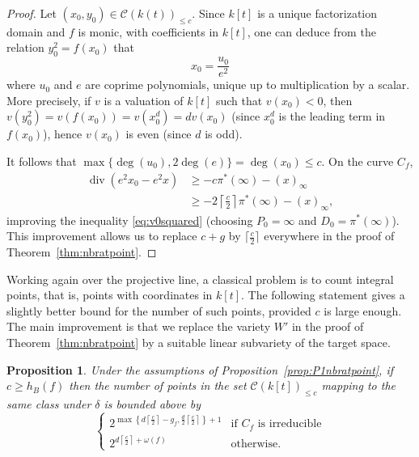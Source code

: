 \documentclass[11pt]{article}
\theoremstyle{plain}
\newtheorem{proposition}[theorem]{Proposition}
\theoremstyle{definition}
\DeclareMathOperator{\divisor}{div}
\begin{document}
\begin{proof}
Let $(x_0,y_0)\in \mathcal{C}(k(t))_{\leq c}$. Since $k[t]$ is a unique factorization domain and $f$ is monic, with coefficients in $k[t]$, one can deduce from the relation $y_0^2=f(x_0)$ that
$$
x_0=\frac{u_0}{e^2}
$$
where $u_0$ and $e$ are coprime polynomials, unique up to multiplication by a scalar. More precisely, if $v$ is a valuation of $k[t]$ such that $v(x_0)<0$, then $v(y_0^2)=v(f(x_0))=v(x_0^d)=dv(x_0)$ (since $x_0^d$ is the leading term in $f(x_0)$), hence $v(x_0)$ is even (since $d$ is odd).

It follows that $\max\{\deg(u_0),2\deg(e)\} = \deg(x_0) \leq c$. On the curve $C_f$,
\begin{align*}
\divisor(e^2x_0-e^2x) &\geq -c\pi^*(\infty) -(x)_\infty \\
                      &\geq -2\left\lceil\frac{c}{2}\right\rceil\pi^*(\infty) -(x)_\infty,
\end{align*}
improving the inequality \eqref{eq:v0squared} (choosing $P_0=\infty$ and $D_0=\pi^*(\infty)$). This improvement allows us to replace $c+g$ by $\lceil\frac{c}{2}\rceil$ everywhere in the proof of Theorem~\ref{thm:nbratpoint}.
\end{proof}

Working again over the projective line, a classical problem is to count integral points, that is, points with coordinates in $k[t]$. The following statement gives a slightly better bound for the number of such points, provided $c$ is large enough. The main improvement is that we replace the variety $W'$ in the proof of Theorem~\ref{thm:nbratpoint} by a suitable linear subvariety of the target space.

\begin{proposition}
\label{prop:P1nbintpoint}
Under the assumptions of Proposition~\ref{prop:P1nbratpoint}, if $c\geq h_B(f)$ then the number of points in the set $\mathcal{C}(k[t])_{\leq c}$ mapping to the same class under $\delta$ is bounded above by
$$
\begin{cases}
2^{\max\left\{d\left\lceil\frac{c}{2}\right\rceil -g_f, \frac{d}{2}\left\lceil\frac{c}{2}\right\rceil\right\}+1} & \text{if $C_f$ is irreducible} \\
2^{d\left\lceil\frac{c}{2}\right\rceil + \omega(f)}  & \text{otherwise.}
\end{cases}
$$
\end{proposition}
\end{document}
